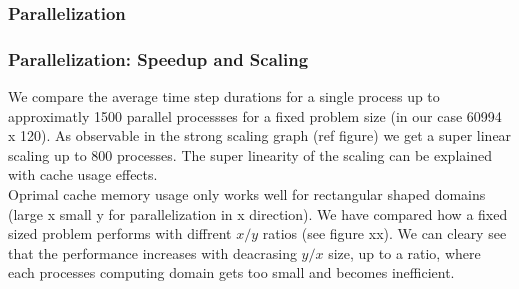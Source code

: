 \documentclass{beamer}
\begin{document}
%
%
%
\begin{frame}
\frametitle{Parallelization}

\end{frame}
%
%
%
\begin{frame}
\frametitle{Parallelization: Speedup and Scaling}
\justify
We compare the average time step durations for a single process up to approximatly 1500 parallel processses for a fixed problem size (in our case 60994 x 120). As observable in the strong scaling graph (ref figure) we get a super linear scaling up to 800 processes. 
The super linearity of the scaling can be explained with cache usage effects. \\
\vspace{2mm}
Oprimal cache memory usage only works well for rectangular shaped domains (large x small y for parallelization in x direction). We have compared how a fixed sized problem performs with diffrent $x/y$ ratios (see figure xx). We can cleary see that the performance increases with deacrasing $y/x$ size, up to a ratio, where each processes computing domain gets too small and becomes inefficient. 
\end{frame}
%
%
%
\end{document}
